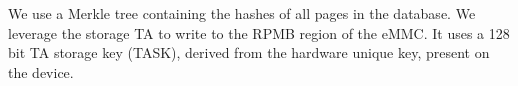 %
We use a Merkle tree containing the hashes of all pages in the database. %
%
We leverage the storage TA to write to the RPMB region of the eMMC. It uses a 128 bit TA storage key (TASK), derived from the hardware unique key, present on the device. %





